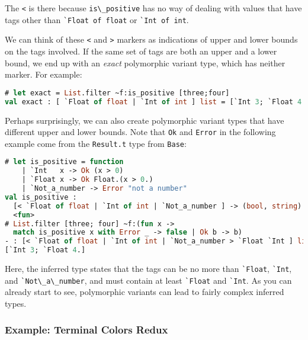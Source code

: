 The \passthrough{\lstinline!<!} is there because
\passthrough{\lstinline!is\_positive!} has no way of dealing with values
that have tags other than \passthrough{\lstinline!`Float of float!} or
\passthrough{\lstinline!`Int of int!}.

We can think of these \passthrough{\lstinline!<!} and
\passthrough{\lstinline!>!} markers as indications of upper and lower
bounds on the tags involved. If the same set of tags are both an upper
and a lower bound, we end up with an \emph{exact} polymorphic variant
type, which has neither marker. For example:

\begin{lstlisting}[language=Caml]
# let exact = List.filter ~f:is_positive [three;four]
val exact : [ `Float of float | `Int of int ] list = [`Int 3; `Float 4.]
\end{lstlisting}

Perhaps surprisingly, we can also create polymorphic variant types that
have different upper and lower bounds. Note that
\passthrough{\lstinline!Ok!} and \passthrough{\lstinline!Error!} in the
following example come from the \passthrough{\lstinline!Result.t!} type
from \passthrough{\lstinline!Base!}: 

\begin{lstlisting}[language=Caml]
# let is_positive = function
    | `Int   x -> Ok (x > 0)
    | `Float x -> Ok Float.(x > 0.)
    | `Not_a_number -> Error "not a number"
val is_positive :
  [< `Float of float | `Int of int | `Not_a_number ] -> (bool, string) result =
  <fun>
# List.filter [three; four] ~f:(fun x ->
  match is_positive x with Error _ -> false | Ok b -> b)
- : [< `Float of float | `Int of int | `Not_a_number > `Float `Int ] list =
[`Int 3; `Float 4.]
\end{lstlisting}

Here, the inferred type states that the tags can be no more than
\passthrough{\lstinline!`Float!}, \passthrough{\lstinline!`Int!}, and
\passthrough{\lstinline!`Not\_a\_number!}, and must contain at least
\passthrough{\lstinline!`Float!} and \passthrough{\lstinline!`Int!}. As
you can already start to see, polymorphic variants can lead to fairly
complex inferred types.

\hypertarget{example-terminal-colors-redux}{%
\subsubsection{Example: Terminal Colors
Redux}\label{example-terminal-colors-redux}}


